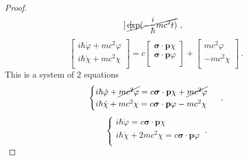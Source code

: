 \begin{proof}
\begin{equation*}
\begin{bmatrix}
            \end{bmatrix} \cancel{\exp(- \frac{i}{\hbar} m c^2 t)} ~,
        \end{equation*}
        \begin{equation*}
            \begin{bmatrix}
                i \hbar \dot \varphi + m c^2 \varphi \\ i \hbar \dot \chi + m c^2 \chi \\
            \end{bmatrix} = c \begin{bmatrix}
                \boldsymbol \sigma \cdot \mathbf p \chi\\
                \boldsymbol \sigma \cdot \mathbf p \varphi \\
            \end{bmatrix} + \begin{bmatrix}
                m c^2 \varphi \\ - m c^2 \chi \\
            \end{bmatrix} ~.
        \end{equation*}
        This is a system of $2$ equations 
        \begin{equation*}
            \begin{cases}
                i \hbar \dot \varphi + \cancel{m c^2 \varphi} = c \boldsymbol \sigma \cdot \mathbf p \chi + \cancel{m c^2 \varphi} \\
                i \hbar \dot \chi + m c^2 \chi = c \boldsymbol \sigma \cdot \mathbf p \varphi - m c^2 \chi \\
            \end{cases} ~,
        \end{equation*}
        \begin{equation*}
            \begin{cases}
                i \hbar \dot \varphi = c \boldsymbol \sigma \cdot \mathbf p \chi \\
                i \hbar \dot \chi + 2m c^2 \chi = c \boldsymbol \sigma \cdot \mathbf p \varphi \\
            \end{cases} ~.
        \end{equation*}


\end{proof}
